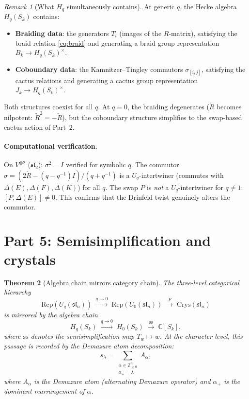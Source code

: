 \documentclass[11pt]{article}
\newtheorem{theorem}{Theorem}
\theoremstyle{remark}
\newtheorem{remark}[theorem]{Remark}
\newcommand{\CC}{\mathbb{C}}
\newcommand{\ZZ}{\mathbb{Z}}
\newcommand{\Rep}{\mathrm{Rep}}
\newcommand{\Crys}{\mathrm{Crys}}
\begin{document}
\begin{remark}[What $H_q$ simultaneously contains]
At generic $q$, the Hecke algebra $H_q(S_k)$ contains:
\begin{itemize}
  \item \textbf{Braiding data}: the generators $T_i$ (images of the $R$-matrix),
    satisfying the braid relation \eqref{eq:braid} and generating a braid group
    representation $B_k \to H_q(S_k)^\times$.
  \item \textbf{Coboundary data}: the Kamnitzer--Tingley commutors $\sigma_{[i,j]}$,
    satisfying the cactus relations and generating a cactus group representation
    $J_k \to H_q(S_k)^\times$.
\end{itemize}
Both structures coexist for all $q$. At $q=0$, the braiding degenerates
($\check{R}$ becomes nilpotent: $\check{R}^2 = -\check{R}$),
but the coboundary structure simplifies to the swap-based cactus action
of Part~2.
\end{remark}

\paragraph{Computational verification.}
On $V^{\otimes 2}$ ($\mathfrak{sl}_2$): $\sigma^2 = I$ verified for symbolic $q$.
The commutor $\sigma = (2\check{R}-(q-q^{-1})I)/(q+q^{-1})$ is a $U_q$-intertwiner
(commutes with $\Delta(E), \Delta(F), \Delta(K)$) for all $q$.
The swap $P$ is \emph{not} a $U_q$-intertwiner for $q \ne 1$:
$[P, \Delta(E)] \ne 0$.
This confirms that the Drinfeld twist genuinely alters the commutor.

\section{Part 5: Semisimplification and crystals}
\label{sec:part5}

\begin{theorem}[Algebra chain mirrors category chain]
\label{thm:part5}
The three-level categorical hierarchy
\[
  \Rep(U_q(\mathfrak{sl}_n)) \;\xrightarrow{q \to 0}\; \Rep(U_0(\mathfrak{sl}_n))
  \;\xrightarrow{F}\; \Crys(\mathfrak{sl}_n)
\]
is mirrored by the algebra chain
\[
  H_q(S_k) \;\xrightarrow{q \to 0}\; H_0(S_k) \;\xrightarrow{\mathrm{ss}}\; \CC[S_k],
\]
where $\mathrm{ss}$ denotes the semisimplification map $T_w \mapsto w$.
At the character level, this passage is recorded by the Demazure atom decomposition:
\begin{equation}\label{eq:atom-decomp}
  s_\lambda = \sum_{\substack{\alpha \in \ZZ_{\ge 0}^n \\ \alpha_+ = \lambda}} A_\alpha,
\end{equation}
where $A_\alpha$ is the Demazure atom (alternating Demazure operator) and $\alpha_+$
is the dominant rearrangement of $\alpha$.
\end{theorem}
\end{document}
